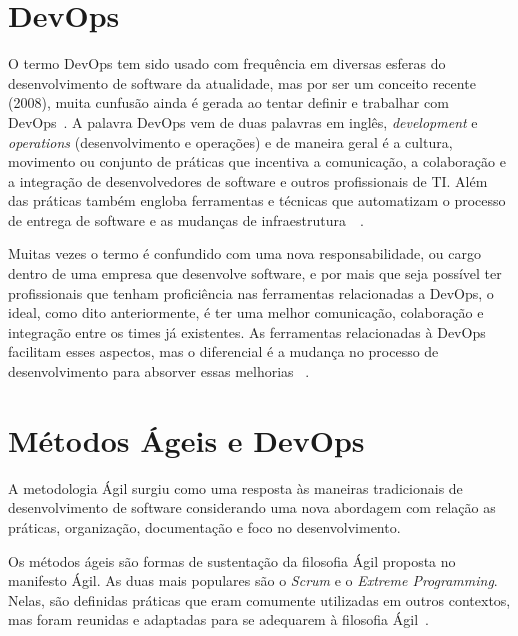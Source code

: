 \section{DevOps}
\label{sec:devops}

O termo DevOps tem sido usado com frequência em diversas esferas do
desenvolvimento de software da atualidade, mas por ser um conceito recente
(2008), muita cunfusão ainda é gerada ao tentar definir e trabalhar com
DevOps~\cite{adambertram:2016}. A palavra DevOps vem de duas palavras em
inglês, \textit{development} e \textit{operations} (desenvolvimento e operações) e de maneira
geral é a cultura, movimento ou conjunto de práticas que incentiva
a comunicação, a colaboração e a integração de desenvolvedores de software
e outros profissionais de TI. Além das práticas também engloba ferramentas
e técnicas que automatizam o processo de entrega de software e as mudanças
de infraestrutura~\cite{loukides2012devops}~\cite{erich2014mapping}.

Muitas vezes o termo é confundido com uma nova responsabilidade, ou cargo
dentro de uma empresa que desenvolve software, e por mais que seja possível
ter profissionais que tenham proficiência nas ferramentas relacionadas a
DevOps, o ideal, como dito anteriormente, é ter uma melhor comunicação,
colaboração e integração entre os times já existentes. As ferramentas
relacionadas à DevOps facilitam esses aspectos, mas o diferencial é a
mudança no processo de desenvolvimento para absorver essas melhorias
~\cite{adambertram:2016}.


\section{Métodos Ágeis e DevOps}
\label{sec:agile-devops}

A metodologia Ágil surgiu como uma resposta às maneiras tradicionais de desenvolvimento
de software considerando uma nova abordagem com relação as práticas, organização,
documentação e foco no desenvolvimento.~\cite{agilemetorg:2016}

Os métodos ágeis são formas de sustentação da filosofia Ágil proposta no manifesto
Ágil\cite{fowler:2001}. As duas mais populares são o \textit{Scrum} e o \textit{Extreme Programming}. Nelas,
são definidas práticas que eram comumente utilizadas em outros contextos,
mas foram reunidas e adaptadas para se adequarem à filosofia Ágil~\cite{shore:2007}.

